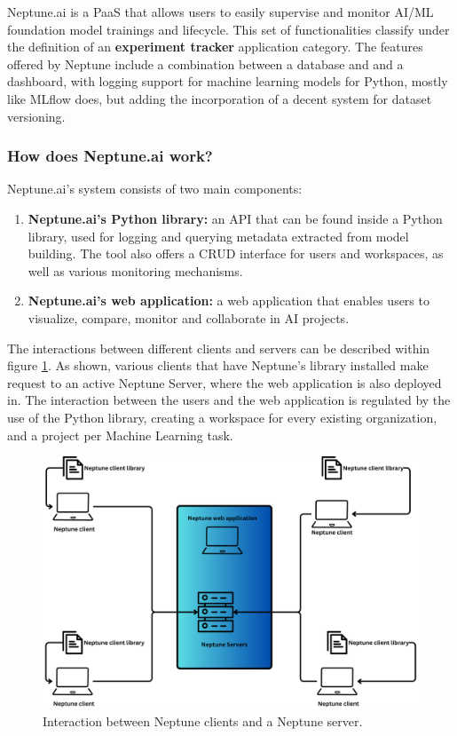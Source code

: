 Neptune.ai is a \acrshort{PaaS} that allows users to easily supervise and monitor \acrshort{AI}/\acrshort{ML} foundation model trainings and lifecycle. This set of 
functionalities classify under the definition of an \textbf{experiment tracker} application category. The features offered by Neptune include a combination between
a database and and a dashboard, with logging support for machine learning models for Python, mostly like MLflow does, but adding the incorporation of a decent system
for dataset versioning.

\subsubsection{How does Neptune.ai work?\cite{neptunedocs}}

Neptune.ai's system consists of two main components:

\begin{enumerate}
    \item \textbf{Neptune.ai's Python library: }an \acrshort{API} that can be found inside a Python library, used for logging and querying metadata extracted from model
    building. The tool also offers a \acrfull{CRUD} interface for users and workspaces, as well as various monitoring mechanisms.

    \item \textbf{Neptune.ai's web application: }a web application that enables users to visualize, compare, monitor and collaborate in \acrshort{AI} projects.
\end{enumerate}

The interactions between different clients and servers can be described within figure \ref{fig:NeptuneDiag}. As shown, various clients that have Neptune's library installed make request to an
active Neptune Server, where the web application is also deployed in. The interaction between the users and the web application is regulated by the use of the Python library, creating a workspace
for every existing organization, and a project per Machine Learning task.

\begin{figure}[H]
    \centering
    \includegraphics[width=0.8\linewidth]{figs/neptune-clientserver.png}
    \caption{Interaction between Neptune clients and a Neptune server.}
    \label{fig:NeptuneDiag}
\end{figure}

